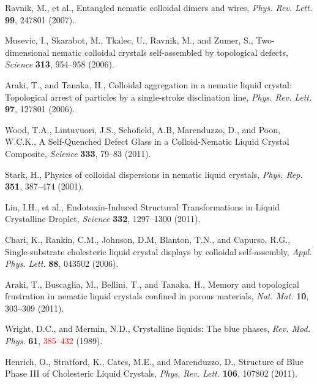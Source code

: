 \documentclass[12pt]{article}
\begin{document}
\pagebreak

\begin{thebibliography}{99}

Ravnik, M., et al.,
Entangled nematic colloidal dimers and wires, 
{\it Phys. Rev. Lett.} {\bf 99}, 247801 (2007).

Musevic, I., Skarabot, M., Tkalec, U., Ravnik, M., and Zumer, S.,
Two-dimensional nematic colloidal crystals self-assembled by topological
defects,
{\it Science} {\bf 313}, 954--958 (2006).

Araki, T., and Tanaka, H.,
Colloidal aggregation in a nematic liquid crystal: Topological arrest of
particles by a single-stroke disclination line,
{\it Phys. Rev. Lett.} {\bf 97}, 127801 (2006).

Wood, T.A., Lintuvuori, J.S., Schofield, A.B, Marenduzzo, D., and
Poon, W.C.K.,
A Self-Quenched Defect Glass in a Colloid-Nematic Liquid Crystal Composite,
{\it Science} {\bf 333}, 79--83 (2011).

 Stark, H.,
Physics of colloidal dispersions in nematic liquid crystals,
{\it Phys. Rep.} {\bf 351}, 387--474 (2001).

Lin, I.H., et al.,
Endotoxin-Induced Structural Transformations in Liquid Crystalline Droplet,
{\it Science} {\bf 332}, 1297--1300 (2011).

Chari, K., Rankin, C.M., Johnson, D.M, Blanton, T.N., and Capurso, R.G.,
Single-substrate cholesteric liquid crystal displays by colloidal
self-assembly,
{\it Appl. Phys. Lett.} {\bf 88}, 043502 (2006).

Araki, T., Buscaglia, M., Bellini, T., and Tanaka, H.,
Memory and topological frustration in nematic liquid crystals confined
in porous materials, {\it Nat. Mat.} {\bf 10}, 303--309 (2011).

 Wright, D.C., and Mermin, N.D.,
Crystalline liquids: The blue phases, {\it Rev. Mod. Phys.} {\bf 61},
\textcolor{red}{385--432} (1989).

 Henrich, O., Stratford, K., Cates, M.E., and Marenduzzo, D.,
 Structure of Blue Phase III of Cholesteric Liquid Crystals,
{\it Phys. Rev. Lett.} {\bf 106}, 107802 (2011).


\end{thebibliography}
\end{document}
